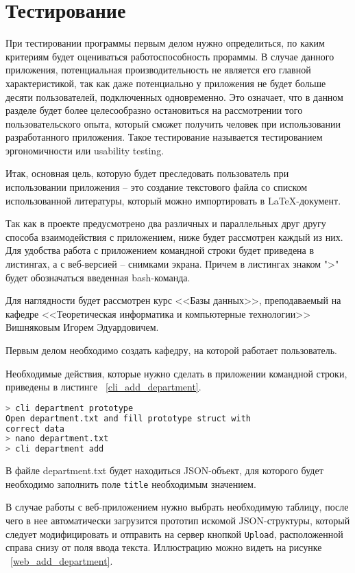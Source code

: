 \section*{Тестирование}

При тестировании программы первым делом нужно определиться, по каким критериям будет
оцениваться работоспособность прораммы. В случае данного приложения, потенциальная производительность не является его
главной характеристикой, так как даже потенциально у приложения не будет больше десяти пользователей,
подключенных одновременно. Это означает, что в данном разделе будет более целесообразно остановиться на
рассмотрении того пользовательского опыта, который сможет получить человек при использовании разработанного
приложения. Такое тестирование называется тестированием эргономичности или usability testing.

Итак, основная цель, которую будет преследовать пользователь при использовании приложения -- это создание
текстового файла со списком использованной литературы, который можно импортировать в LaTeX-документ.

Так как в проекте предусмотрено два различных и параллельных друг другу способа взаимодействия с приложением,
ниже будет рассмотрен каждый из них. Для удобства работа с приложением командной строки будет приведена
в листингах, а с веб-версией -- снимками экрана. Причем в листингах знаком ">" будет обозначаться введенная
bash-команда.

Для наглядности будет рассмотрен курс <<Базы данных>>, преподаваемый на кафедре <<Теоретическая информатика и компьютерные технологии>>
Вишняковым Игорем Эдуардовичем.

Первым делом необходимо создать кафедру, на которой работает пользователь.

Необходимые действия, которые нужно сделать в приложении командной строки, приведены в листинге ~\ref{cli_add_department}.

\begin{lstlisting}[language=bash, caption = {Добавление кафедры}, captionpos=b, label={cli_add_department}]
> cli department prototype
Open department.txt and fill prototype struct with 
correct data
> nano department.txt 
> cli department add
\end{lstlisting}

В файле department.txt будет находиться JSON-объект, для которого будет необходимо заполнить поле \texttt{title}
необходимым значением.

В случае работы с веб-приложением нужно выбрать необходимую таблицу, после чего в нее автоматически загрузится прототип
искомой JSON-структуры, который следует модифицировать и отправить на сервер кнопкой \texttt{Upload}, расположенной справа снизу
от поля ввода текста. Иллюстрацию можно видеть на рисунке ~\ref{web_add_department}.

